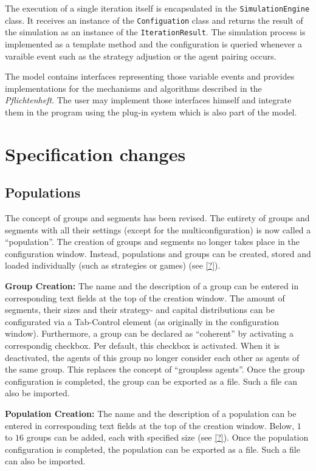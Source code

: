 \documentclass[parskip=full,11pt]{scrartcl}
\begin{document}
The execution of a single iteration itself is encapsulated in the \texttt{SimulationEngine} class. It receives an instance of the \texttt{Configuation} class and returns the result of the simulation as an instance of the \texttt{IterationResult}. The simulation process is implemented as a template method and the configuration is queried whenever a varaible event such as the strategy adjustion or the agent pairing occurs.

The model contains interfaces representing those variable events and provides implementations for the mechanisms and algorithms described in the \textit{Pflichtenheft}. The user may implement those interfaces himself and integrate them in the program using the plug-in system which is also part of the model.

\section{Specification changes}

\subsection{Populations}
The concept of groups and segments has been revised. The entirety of groups and segments with all their settings (except for the multiconfiguration) is now called a \enquote{population}. The creation of groups and segments no longer takes place in the configuration window. Instead, populations and groups can be created, stored and loaded individually (such as strategies or games) (see \cref{?}).

\textbf{Group Creation:}
The name and the description of a group can be entered in corresponding text fields at the top of the creation window. The amount of segments, their sizes and their strategy- and capital distributions can be configurated via a Tab-Control element (as originally in the configuration window). Furthermore, a group can be declared as \enquote{coherent} by activating a correspondig checkbox. Per default, this checkbox is activated. When it is deactivated, the agents of this group no longer consider each other as agents of the same group. This replaces the concept of \enquote{groupless agents}. Once the group configuration is completed, the group can be exported as a file. Such a file can also be imported.

\textbf{Population Creation:}
The name and the description of a population can be entered in corresponding text fields at the top of the creation window. Below, \(1\) to \(16\) groups can be added, each with specified size (see \cref{?}). Once the population configuration is completed, the population can be exported as a file. Such a file can also be imported.
\end{document}
